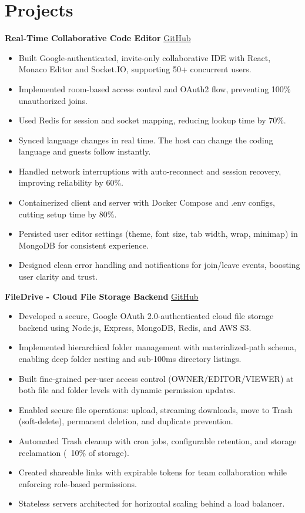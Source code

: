 \documentclass[a4paper,10pt]{article}
\newcommand{\resumeItem}[1]{\item\small{#1}}
\begin{document}
\section*{Projects}
\textbf{Real-Time Collaborative Code Editor} \hfill \href{https://github.com/mohankumarkadiri/collab-code-editor}{GitHub}
\vspace{6pt}
\begin{itemize}[leftmargin=*,itemsep=2pt]
  \resumeItem{Built Google-authenticated, invite-only collaborative IDE with React, Monaco Editor and Socket.IO, supporting 50+ concurrent users.}
  \resumeItem{Implemented room-based access control and OAuth2 flow, preventing 100\% unauthorized joins.}
  \resumeItem{Used Redis for session and socket mapping, reducing lookup time by 70\%.}
  \resumeItem{Synced language changes in real time. The host can change the coding language and guests follow instantly.}
  \resumeItem{Handled network interruptions with auto-reconnect and session recovery, improving reliability by 60\%.}
  \resumeItem{Containerized client and server with Docker Compose and .env configs, cutting setup time by 80\%.}
  \resumeItem{Persisted user editor settings (theme, font size, tab width, wrap, minimap) in MongoDB for consistent experience.}
  \resumeItem{Designed clean error handling and notifications for join/leave events, boosting user clarity and trust.}
\end{itemize}

\vspace{6pt}

\textbf{FileDrive - Cloud File Storage Backend} \hfill \href{https://github.com/mohankumarkadiri/File-Drive}{GitHub}
\vspace{6pt}
\begin{itemize}[leftmargin=*,itemsep=2pt]
  \resumeItem{Developed a secure, Google OAuth 2.0-authenticated cloud file storage backend using Node.js, Express, MongoDB, Redis, and AWS S3.}
  \resumeItem{Implemented hierarchical folder management with materialized-path schema, enabling deep folder nesting and sub-100ms directory listings.}
  \resumeItem{Built fine-grained per-user access control (OWNER/EDITOR/VIEWER) at both file and folder levels with dynamic permission updates.}
  \resumeItem{Enabled secure file operations: upload, streaming downloads, move to Trash (soft-delete), permanent deletion, and duplicate prevention.}
  \resumeItem{Automated Trash cleanup with cron jobs, configurable retention, and storage reclamation (~10\% of storage).}
  \resumeItem{Created shareable links with expirable tokens for team collaboration while enforcing role-based permissions.}
  \resumeItem{Stateless servers architected for horizontal scaling behind a load balancer.}
\end{itemize}
\end{document}
